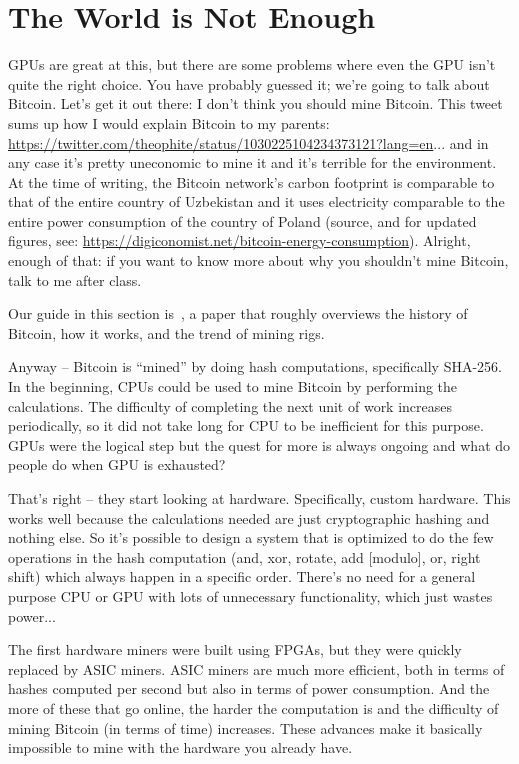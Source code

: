 \section*{The World is Not Enough}
GPUs are great at this, but there are some problems where even the GPU isn't quite the right choice. You have probably guessed it; we're going to talk about Bitcoin. Let's get it out there: I don't think you should mine Bitcoin. This tweet sums up how I would explain Bitcoin to my parents: \url{https://twitter.com/theophite/status/1030225104234373121?lang=en}... and in any case it's pretty uneconomic to mine it and it's terrible for the environment. At the time of writing, the Bitcoin network's carbon footprint is comparable to that of the entire country of Uzbekistan and it uses electricity comparable to the entire power consumption of the country of Poland (source, and for updated figures, see: \url{https://digiconomist.net/bitcoin-energy-consumption}). Alright, enough of that: if you want to know more about why you shouldn't mine Bitcoin, talk to me after class. 

Our guide in this section is~\cite{bitcoin}, a paper that roughly overviews the history of Bitcoin, how it works, and the trend of mining rigs. 

Anyway -- Bitcoin is ``mined'' by doing hash computations, specifically SHA-256. In the beginning, CPUs could be used to mine Bitcoin by performing the calculations. The difficulty of completing the next unit of work increases periodically, so it did not take long for CPU to be inefficient for this purpose. GPUs were the logical step but the quest for more is always ongoing and what do people do when GPU is exhausted?

That's right -- they start looking at hardware. Specifically, custom hardware. This works well because the calculations needed are just cryptographic hashing and nothing else. So it's possible to design a system that is optimized to do the few operations in the hash computation (and, xor, rotate, add [modulo], or, right shift) which always happen in a specific order. There's no need for a general purpose CPU or GPU with lots of unnecessary functionality, which just wastes power...

 The first hardware miners were built using FPGAs, but they were quickly replaced by ASIC miners. ASIC miners are much more efficient, both in terms of hashes computed per second but also in terms of power consumption. And the more of these that go online, the harder the computation is and the difficulty of mining Bitcoin (in terms of time) increases. These advances make it basically impossible to mine with the hardware you already have.

